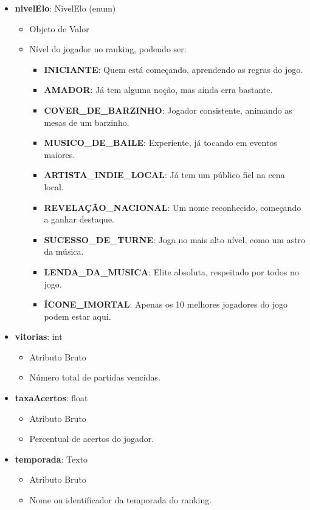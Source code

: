 \begin{itemize}
        \item \textbf{nivelElo}: NivelElo (enum)  
              \begin{itemize}
                  \item Objeto de Valor
                  \item Nível do jogador no ranking, podendo ser:
                  \begin{itemize}
                      \item \textbf{INICIANTE}: Quem está começando, aprendendo as regras do jogo.
                      \item \textbf{AMADOR}: Já tem alguma noção, mas ainda erra bastante.
                      \item \textbf{COVER\_DE\_BARZINHO}: Jogador consistente, animando as mesas de um barzinho.
                      \item \textbf{MUSICO\_DE\_BAILE}: Experiente, já tocando em eventos maiores.
                      \item \textbf{ARTISTA\_INDIE\_LOCAL}: Já tem um público fiel na cena local.
                      \item \textbf{REVELAÇÃO\_NACIONAL}: Um nome reconhecido, começando a ganhar destaque.
                      \item \textbf{SUCESSO\_DE\_TURNE}: Joga no mais alto nível, como um astro da música.
                      \item \textbf{LENDA\_DA\_MUSICA}: Elite absoluta, respeitado por todos no jogo.
                      \item \textbf{ÍCONE\_IMORTAL}: Apenas os 10 melhores jogadores do jogo podem estar aqui.
                  \end{itemize}
              \end{itemize}
    
        \item \textbf{vitorias}: int  
              \begin{itemize}
                  \item Atributo Bruto
                  \item Número total de partidas vencidas.
              \end{itemize}
    
        \item \textbf{taxaAcertos}: float  
              \begin{itemize}
                  \item Atributo Bruto
                  \item Percentual de acertos do jogador.
              \end{itemize}
    
        \item \textbf{temporada}: Texto  
              \begin{itemize}
                  \item Atributo Bruto
                  \item Nome ou identificador da temporada do ranking.
              \end{itemize}
    \end{itemize}
    
